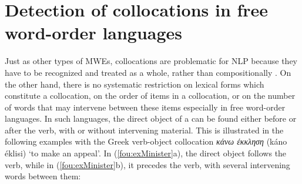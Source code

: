 \documentclass[output=paper]{langsci/langscibook}
\begin{document}
\section{Detection of collocations in free word-order languages}
\label{fou:sec4}
Just as other types of MWEs, collocations are problematic for NLP because they have to be recognized and treated as a whole, rather than compositionally \citep{sag02}. On the other hand, there is no systematic restriction on lexical forms which constitute a collocation, on the order of items in a collocation, or on the number of words that may intervene between these items especially in free word-order languages. In such languages, the direct object of a  can be found either before or after the verb, with or without intervening material. This is illustrated in the following examples with the Greek verb-object collocation {\em κάνω έκκληση} (káno éklisi)
`to make an appeal'. 
In (\ref{fou:exMinister}a), %
the direct object 
follows the verb, while in (\ref{fou:exMinister}b), %
it precedes the verb, with several intervening words between them:


\end{document}
